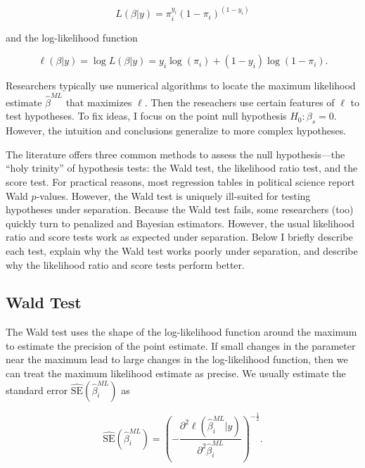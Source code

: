 \documentclass[
]{article}
\begin{document}
\begin{equation*}
L(\beta | y) = \pi_{i}^{y_i}(1 - \pi_{i})^{(1 - y_i)}
\end{equation*}

\noindent and the log-likelihood function

\begin{equation*}
\ell(\beta | y) = \log L(\beta | y) = y_i \log(\pi_{i}) + (1 - y_i) \log(1 - \pi_{i}).
\end{equation*}

\noindent Researchers typically use numerical algorithms to locate the
maximum likelihood estimate \(\hat{\beta}^{ML}\) that maximizes
\(\ell\). Then the reseachers use certain features of \(\ell\) to test
hypotheses. To fix ideas, I focus on the point null hypothesis
\(H_0: \beta_s = 0\). However, the intuition and conclusions generalize
to more complex hypotheses.

The literature offers three common methods to assess the null
hypothesis---the ``holy trinity'' of hypothesis tests: the Wald test,
the likelihood ratio test, and the score test. For practical reasons,
most regression tables in political science report Wald \(p\)-values.
However, the Wald test is uniquely ill-suited for testing hypotheses
under separation. Because the Wald test fails, some researchers (too)
quickly turn to penalized and Bayesian estimators. However, the usual
likelihood ratio and score tests work as expected under separation.
Below I briefly describe each test, explain why the Wald test works
poorly under separation, and describe why the likelihood ratio and score
tests perform better.

\hypertarget{wald-test}{%
\subsection{Wald Test}\label{wald-test}}

The Wald test uses the shape of the log-likelihood function around the
maximum to estimate the precision of the point estimate. If small
changes in the parameter near the maximum lead to large changes in the
log-likelihood function, then we can treat the maximum likelihood
estimate as precise. We usually estimate the standard error
\(\widehat{\text{SE}}(\hat{\beta}_i^{ML})\) as

\begin{equation*}\label{eqn:ml-se}
\widehat{\text{SE}} \left( \hat{\beta}_i^{ML} \right) = \left( - \dfrac{\partial^2 \ell(\hat{\beta}_i^{ML} | y)}{\partial^2 \hat{\beta}_i^{ML}} \right)^{-\frac{1}{2}}\text{.}
\end{equation*}
\end{document}
